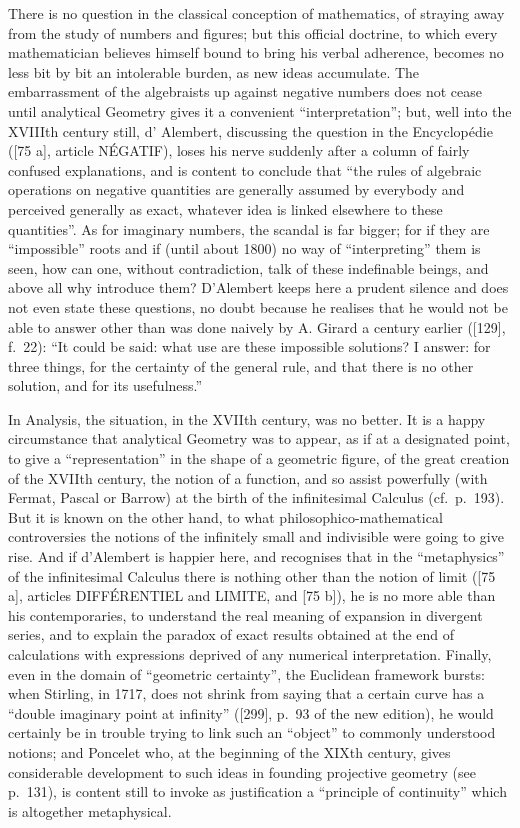 There is no question in the classical conception of mathematics, of straying away from the study of numbers and figures; but this official doctrine, to which every mathematician believes himself bound to bring his verbal adherence, becomes no less bit by bit an intolerable burden, as new ideas accumulate. The embarrassment of the algebraists up against negative numbers does not cease until analytical Geometry gives it a convenient ``interpretation''; but, well into the XVIIIth century still, d' Alembert, discussing the question in the Encyclopédie ({[}75 a{]}, article NÉGATIF), loses his nerve suddenly after a column of fairly confused explanations, and is content to conclude that ``the rules of algebraic operations on negative quantities are generally assumed by everybody and perceived generally as exact, whatever idea is linked elsewhere to these quantities''. As for imaginary numbers, the scandal is far bigger; for if they are ``impossible'' roots and if (until about 1800) no way of ``interpreting'' them is seen, how can one, without contradiction, talk of these indefinable beings, and above all why introduce them? D'Alembert keeps here a prudent silence and does not even state these questions, no doubt because he realises that he would not be able to answer other than was done naively by A. Girard a century earlier ({[}129{]}, f.~22): ``It could be said: what use are these impossible solutions? I answer: for three things, for the certainty of the general rule, and that there is no other solution, and for its usefulness.''

In Analysis, the situation, in the XVIIth century, was no better. It is a happy circumstance that analytical Geometry was to appear, as if at a designated point, to give a ``representation'' in the shape of a geometric figure, of the great creation of the XVIIth century, the notion of a function, and so assist powerfully (with Fermat, Pascal or Barrow) at the birth of the infinitesimal Calculus (cf.~p.~193). But it is known on the other hand, to what philosophico-mathematical controversies the notions of the infinitely small and indivisible were going to give rise. And if d'Alembert is happier here, and recognises that in the ``metaphysics'' of the infinitesimal Calculus there is nothing other than the notion of limit ({[}75 a{]}, articles DIFFÉRENTIEL and LIMITE, and {[}75 b{]}), he is no more able than his contemporaries, to understand the real meaning of expansion in divergent series, and to explain the paradox of exact results obtained at the end of calculations with expressions deprived of any numerical interpretation. Finally, even in the domain of ``geometric certainty'', the Euclidean framework bursts: when Stirling, in 1717, does not shrink from saying that a certain curve has a ``double imaginary point at infinity'' ({[}299{]}, p.~93 of the new edition), he would certainly be in trouble trying to link such an ``object'' to commonly understood notions; and Poncelet who, at the beginning of the XIXth century, gives considerable development to such ideas in founding projective geometry (see p.~131), is content still to invoke as justification a ``principle of continuity'' which is altogether metaphysical.

